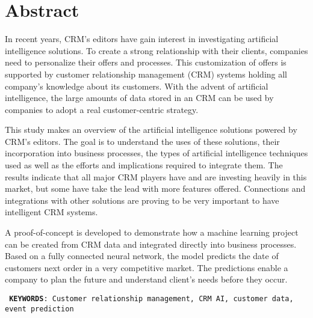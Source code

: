 

\chapter*{Abstract}

\vspace{0.5cm}

In recent years, CRM's editors have gain interest in investigating artificial intelligence solutions. To create a strong relationship with their clients, companies need to personalize their offers and processes. This customization of offers is supported by customer relationship management (CRM) systems holding all company's knowledge about its customers. With the advent of artificial intelligence, the large amounts of data stored in an CRM can be used by companies to adopt a real customer-centric strategy.

This study makes an overview of the artificial intelligence solutions powered by CRM's editors. The goal is to understand the uses of these solutions, their incorporation into business processes, the types of artificial intelligence techniques used as well as the efforts and implications required to integrate them. The results indicate that all major CRM players have and are investing heavily in this market, but some have take the lead with more features offered. Connections and integrations with other solutions are proving to be very important to have intelligent CRM systems.

A proof-of-concept is developed to demonstrate how a machine learning project can be created from CRM data and integrated directly into business processes. Based on a fully connected neural network, the model predicts the date of customers next order in a very competitive market. The predictions enable a company to plan the future and understand client's needs before they occur.

\vspace{0.7cm}

\texttt{ \justifyi \textbf{KEYWORDS}: Customer relationship management, CRM AI, customer data, event prediction}

